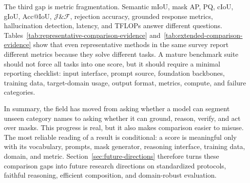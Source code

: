 The third gap is metric fragmentation. Semantic mIoU, mask AP, PQ, cIoU, gIoU, Acc@IoU, $\mathcal{J}\&\mathcal{F}$, rejection accuracy, grounded response metrics, hallucination detection, latency, and TFLOPs answer different questions. Tables~\ref{tab:representative-comparison-evidence} and~\ref{tab:extended-comparison-evidence} show that even representative methods in the same survey report different metrics because they solve different tasks. A mature benchmark suite should not force all tasks into one score, but it should require a minimal reporting checklist: input interface, prompt source, foundation backbones, training data, target-domain usage, output format, metrics, compute, and failure categories.

In summary, the field has moved from asking whether a model can segment unseen category names to asking whether it can ground, reason, verify, and act over masks. This progress is real, but it also makes comparison easier to misuse. The most reliable reading of a result is conditional: a score is meaningful only with its vocabulary, prompts, mask generator, reasoning interface, training data, domain, and metric. Section~\ref{sec:future-directions} therefore turns these comparison gaps into future research directions on standardized protocols, faithful reasoning, efficient composition, and domain-robust evaluation.
